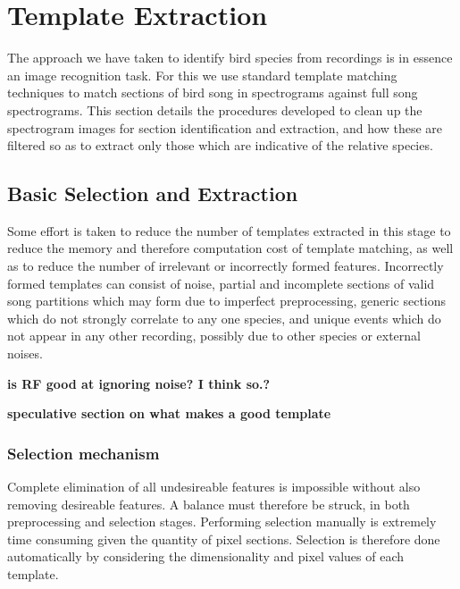 \section{Template Extraction}
The approach we have taken to identify bird species from recordings is in
essence an image recognition task.
For this we use standard template matching techniques to match sections of
bird song in spectrograms against full song spectrograms.
This section details the procedures developed to clean up the spectrogram images
for section identification and extraction, and how these are filtered so as to
extract only those which are indicative of the relative species.



\subsection{Basic Selection and Extraction}\label{sec:template_select}
Some effort is taken to reduce the number of templates extracted in this stage
to reduce the memory and therefore computation cost of template matching, as well
as to reduce the number of irrelevant or incorrectly formed features.
Incorrectly formed templates can consist of noise, partial and incomplete
sections of valid song partitions which may form due to imperfect preprocessing,
generic sections which do not strongly correlate to any one species,
and unique events which do not appear in any other recording, possibly due to
other species or external noises.

\textbf{is RF good at ignoring noise? I think so.?}

\textbf{speculative section on what makes a good template}

\subsubsection{Selection mechanism}
Complete elimination of all undesireable features is impossible without also
removing desireable features.
A balance must therefore be struck, in both preprocessing and selection stages.
Performing selection manually is extremely time consuming given the quantity
of pixel sections.
Selection is therefore done automatically by considering the dimensionality and
pixel values of each template.\\


